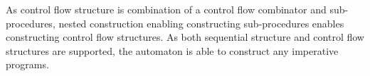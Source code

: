 As control flow structure is combination of a control flow combinator and sub-procedures, 
nested construction enabling constructing sub-procedures enables constructing control flow structures.
As both sequential structure and control flow structures are supported, the automaton is able to construct any imperative programs.

%
%
%
%
%
%
%
%
%
%


